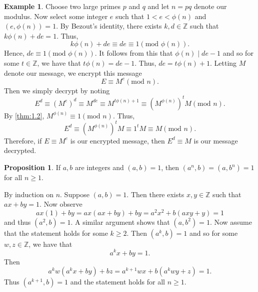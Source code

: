 \documentclass{article}
\makeatletter
\theoremstyle{definition}
\newtheorem{prop}{Proposition}[section]
\theoremstyle{remark}
\let\oldproofname=\proofname
\renewcommand{\proofname}{\textit{\oldproofname}}
\theoremstyle{definition}
\newtheorem{example}{Example}[section]
\renewenvironment{proof}[1][\proofname]{\par
  \pushQED{\qed}%
  \normalfont \topsep6\p@\@plus6\p@\relax
  \list{}{\leftmargin=0mm
          \rightmargin=0mm
          \settowidth{\itemindent}{\itshape#1}%
          \labelwidth=\itemindent
          \parsep=0pt \listparindent=0mm%
  }
  \item[\hskip\labelsep
        \itshape
    #1\@addpunct{.}]\ignorespaces
}{%
  \popQED\endlist\@endpefalse
}
\makeatother
\begin{document}
    \begin{example}\label{ex:1.1}
        Choose two large primes $p$ and $q$ and let $n=pq$ denote our modulus. Now select some integer $e$ such that $1<e<\phi(n)$ and $(e,\phi(n))=1$. By Bezout's identity, there exists $k,d\in\mathbb{Z}$ such that $k\phi(n)+de=1$. Thus,
            \begin{equation*}
                k\phi(n)+de\equiv de\equiv 1(\text{mod }\phi(n)).
            \end{equation*}
        Hence, $de\equiv 1(\text{mod }\phi(n))$. It follows from this that $\phi(n)\mid de-1$ and so for some $t\in\mathbb{Z}$, we have that $t\phi(n)=de-1$. Thus, $de=t\phi(n)+1$. Letting $M$ denote our message, we encrypt this message
            \begin{equation*}
                E\equiv M^e(\text{mod }n).
            \end{equation*}
        Then we simply decrypt by noting
            \begin{equation*}
                E^d\equiv (M^e)^d\equiv M^{de}\equiv M^{t\phi(n)+1}\equiv(M^{\phi(n)})^tM(\text{mod }n).
            \end{equation*}
        By \cref{thm:1.2}, $M^{\phi(n)}\equiv 1(\text{mod }n)$. Thus, 
            \begin{equation*}
                E^d\equiv (M^{\phi(n)})^tM\equiv 1^tM\equiv M(\text{mod }n).
            \end{equation*}
        Therefore, if $E\equiv M^e$ is our encrypted message, then $E^d\equiv M$ is our message decrypted.
    \end{example}\newpage
    \begin{prop}\label{prop:1.1}
        If $a,b$ are integers and $(a,b)=1$, then $(a^n,b)=(a,b^n)=1$ for all $n\geq 1$.
    \end{prop}
        \begin{proof}
            By induction on $n$. Suppose $(a,b)=1$. Then there exists $x,y\in\mathbb{Z}$ such that $ax+by=1$. Now observe
                \begin{equation*}
                    ax(1)+by=ax(ax+by)+by=a^2x^2+b(axy+y)=1
                \end{equation*}
            and thus $(a^2,b)=1$. A similar argument shows that $(a,b^2)=1$. Now assume that the statement holds for some $k\geq 2$. Then $(a^k,b)=1$ and so for some $w,z\in\mathbb{Z}$, we have that 
                \begin{equation*}
                    a^kx+by=1.
                \end{equation*}
            Then
                \begin{equation*}
                    a^kw(a^kx+by)+bz=a^{k+1}wx+b(a^kwy+z)=1.
                \end{equation*}
            Thus $(a^{k+1},b)=1$ and the statement holds for all $n\geq 1$.
        \end{proof}
\end{document}
